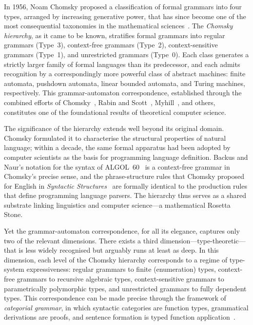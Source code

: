 \documentclass[12pt,a4paper]{article}
\begin{document}
In 1956, Noam Chomsky proposed a classification of formal grammars into four
types, arranged by increasing generative power, that has since become one of
the most consequential taxonomies in the mathematical sciences~\cite{Chomsky1956}.
The \emph{Chomsky hierarchy}, as it came to be known, stratifies formal
grammars into regular grammars (Type~3), context-free grammars (Type~2),
context-sensitive grammars (Type~1), and unrestricted grammars (Type~0). Each
class generates a strictly larger family of formal languages than its
predecessor, and each admits recognition by a correspondingly more powerful
class of abstract machines: finite automata, pushdown automata, linear bounded
automata, and Turing machines, respectively. This grammar-automaton
correspondence, established through the combined efforts of
Chomsky~\cite{Chomsky1959}, Rabin and Scott~\cite{RabinScott1959},
Myhill~\cite{Myhill1957}, and others, constitutes one of the foundational
results of theoretical computer science.

The significance of the hierarchy extends well beyond its original domain.
Chomsky formulated it to characterise the structural properties of natural
language; within a decade, the same formal apparatus had been adopted by
computer scientists as the basis for programming language definition. Backus
and Naur's notation for the syntax of ALGOL~60~\cite{Backus1959,Naur1960} is
a context-free grammar in Chomsky's precise sense, and the phrase-structure
rules that Chomsky proposed for English in \emph{Syntactic
Structures}~\cite{Chomsky1957} are formally identical to the production rules
that define programming language parsers. The hierarchy thus serves as a shared
substrate linking linguistics and computer science---a mathematical Rosetta
Stone.

Yet the grammar-automaton correspondence, for all its elegance, captures only
two of the relevant dimensions. There exists a third dimension---type-theoretic---that is less widely recognised but arguably runs at least as deep. In
this dimension, each level of the Chomsky hierarchy corresponds to a regime of
type-system expressiveness: regular grammars to finite (enumeration) types,
context-free grammars to recursive algebraic types, context-sensitive grammars
to parametrically polymorphic types, and unrestricted grammars to fully
dependent types. This correspondence can be made precise through the framework
of \emph{categorial grammar}, in which syntactic categories are function
types, grammatical derivations are proofs, and sentence formation is typed
function application~\cite{Ajdukiewicz1935,BarHillel1953,Lambek1958}.
\end{document}
